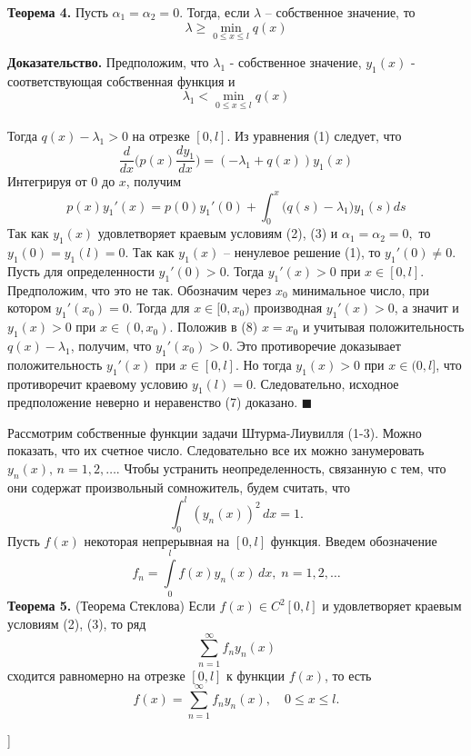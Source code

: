 \textbf{Теорема 4.} Пусть $\alpha_1 = \alpha_2 = 0$. Тогда, если $\lambda$ – собственное значение, то
\begin{equation}
    \lambda \geq \min_{0 \leq x \leq l} q(x)
\end{equation}

\textbf{Доказательство.} Предположим, что $\lambda_1$ - собственное значение, $y_1(x)$
- соответствующая собственная функция и
\begin{equation}\nonumber
\lambda_1 < \min_{0 \leq x \leq l} q(x)
\end{equation}
\\Тогда $q(x)- \lambda_1 > 0$ на отрезке $[0, l]$. Из уравнения (1) следует, что
\begin{equation}\nonumber
\frac{d}{d x} \Big( p(x) \frac{d y_1}{d x} \Big) = (-\lambda_1+q(x))y_1(x)
\end{equation}
Интегрируя от $0$ до $x$, получим
\begin{equation}
    p(x)y_1'(x) = p(0)y_1'(0) + \int_{0}^{x}\big(q(s)-\lambda_1\big)y_1(s)ds
\end{equation}
Так как $y_1(x)$ удовлетворяет краевым условиям (2), (3) и $\alpha_1 =
\alpha_2 = 0,$ то $y_1(0) = y_1(l) = 0$. Так как $y_1(x)$ – ненулевое решение (1), то
$y_1'(0) \neq 0$. Пусть для определенности $y_1'(0)>0$. Тогда $y_1'(x)>0$ при
$x \in [0, l]$. Предположим, что это не так. Обозначим через $x_0$ минимальное
число, при котором $y_1'(x_0) = 0$. Тогда для $x \in [0, x_0)$ производная $y_1'(x) >
0$, а значит и $y_1(x) > 0$ при $x \in (0, x_0)$. Положив в (8) $x = x_0$ и
учитывая положительность $q(x) - \lambda_1$, получим, что $y_1'(x_0) > 0$. Это
противоречие доказывает положительность $y_1'(x)$ при $x \in [0, l]$. Но тогда
$y_1(x) > 0$ при $x \in (0, l]$, что противоречит краевому условию $y_1(l) = 0$.
Следовательно, исходное предположение неверно и неравенство (7) доказано. $\blacksquare$

Рассмотрим собственные функции задачи Штурма-Лиувилля (1-3). Можно показать, что их счетное число. Следовательно все их можно занумеровать $y_n(x), \, n = 1, 2, \dots $. Чтобы устранить неопределенность, связанную с тем, что они содержат произвольный сомножитель,
будем считать, что
\begin{equation}
    \int_0^l (y_n(x))^2 \, dx = 1.
\end{equation}
Пусть $f(x)$ некоторая непрерывная на $[0, l]$ функция. Введем обозначение
\begin{equation}
    f_n = \int \limits_0^l f(x) y_n(x) \, dx, \; n=1,2,\dots
\end{equation}
\textbf{Теорема 5.} (Теорема Стеклова) Если $f(x) \in C^2[0, l]$ и удовлетворяет краевым условиям (2), (3), то ряд
\begin{equation}
    \sum \limits_{n=1}^{\infty} f_n y_n(x)
\end{equation}
сходится равномерно на отрезке $[0, l]$ к функции $f(x)$, то есть
\begin{equation}
    f(x) = \sum \limits_{n=1}^{\infty} f_n y_n(x), \quad 0 \leq x \leq l.
\end{equation}

\bigbreak
[\cite[page 67]{denisov2}]
